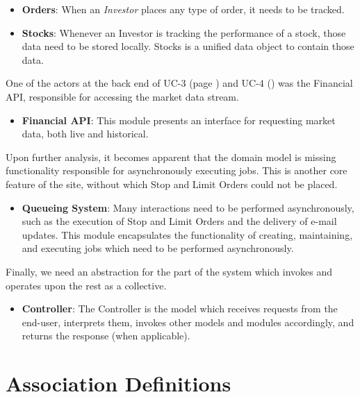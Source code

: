 \begin{itemize}
\item \textbf{Orders}: When an \emph{Investor} places any type of order, it
needs to be tracked. 
\item \textbf{Stocks}: Whenever an Investor is tracking the performance of a
stock, those data need to be stored locally. Stocks is a unified 
data object to contain those data.
\end{itemize}

One of the actors at the back end of UC-3 (page \pageref{UC-3}) and UC-4
(\pageref{UC-4}) was the Financial API, responsible for accessing the 
market data stream. 

\begin{itemize}
\item \textbf{Financial API}: This module presents an interface for requesting market
data, both live and historical. 
\end{itemize}

Upon further analysis, it becomes apparent that the domain model is missing
functionality responsible for asynchronously executing jobs. This is another
core feature of the site, without which Stop and Limit Orders could not 
be placed.

\begin{itemize}
\item \textbf{Queueing System}: Many interactions need to be performed asynchronously,
such as the execution of Stop and Limit Orders and the delivery of e-mail 
updates. This module encapsulates the functionality of creating, maintaining,
and executing jobs which need to be performed asynchronously.
\end{itemize}

Finally, we need an abstraction for the part of the system which invokes and operates
upon the rest as a collective.

\begin{itemize}
\item \textbf{Controller}: The Controller is the model which receives requests from 
the end-user, interprets them, invokes other models and modules accordingly, and 
returns the response (when applicable).
\end{itemize}


\section{Association Definitions}

